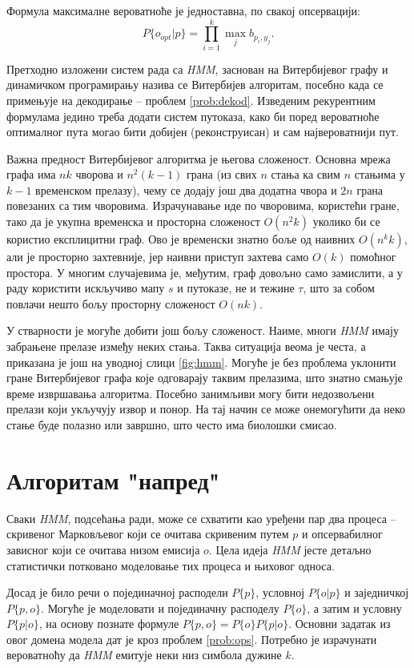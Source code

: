 \documentclass[12pt,oneside]{memoir}
\begin{document}
\begin{CJK}{UTF8}{ipxm}
Формула максималне вероватноће је једноставна, по свакој опсервацији: $$P\{o_{opt} | p\} = \prod_{i=1}^k \max_j b_{p_i, y_j}.$$

Претходно изложени систем рада са \textit{HMM}, заснован на Витербијевог графу и динамичком програмирању назива се Витербијев алгоритам\cite{ba10c}, посебно када се примењује на декодирање -- проблем \ref{prob:dekod}. Изведеним рекурентним формулама једино треба додати систем путоказа, како би поред вероватноће оптималног пута могао бити добијен (реконструисан) и сам највероватнији пут.

Важна предност Витербијевог алгоритма је његова сложеност. Основна мрежа графа има $nk$ чворова и $n^2 (k-1)$ грана (из свих $n$ стања ка свим $n$ стањима у $k-1$ временском прелазу), чему се додају још два додатна чвора и $2n$ грана повезаних са тим чворовима. Израчунавање иде по чворовима, користећи гране, тако да је укупна временска и просторна сложеност $O(n^2 k)$ уколико би се користио експлицитни граф. Ово је временски знатно боље од наивних $O(n^k k)$, али је просторно захтевније, јер наивни приступ захтева само $O(k)$ помоћног простора. У многим случајевима је, међутим, граф довољно само замислити, а у раду користити искључиво мапу $s$ и путоказе, не и тежине $\tau$, што за собом повлачи нешто бољу просторну сложеност $O(nk)$.

У стварности је могуће добити још бољу сложеност. Наиме, многи \textit{HMM} имају забрањене прелазе између неких стања. Таква ситуација веома је честа, а приказана је још на уводној слици \ref{fig:hmm}. Могуће је без проблема уклонити гране Витербијевог графа које одговарају таквим прелазима, што знатно смањује време извршавања алгоритма. Посебно занимљиви могу бити недозвољени прелази који укључују извор и понор. На тај начин се може онемогућити да неко стање буде полазно или завршно, што често има биолошки смисао.

\section{Алгоритам "напред"}
Сваки \textit{HMM}, подсећања ради, може се схватити као уређени пар два процеса -- скривеног Марковљевог који се очитава скривеним путем $p$ и опсервабилног зависног који се очитава низом емисија $o$. Цела идеја \textit{HMM} јесте детаљно статистички потковано моделовање тих процеса и њиховог односа.

Досад је било речи о појединачној расподели $P\{p\}$, условној $P\{o | p\}$ и заједничкој $P\{p, o\}$. Могуће је моделовати и појединачну расподелу $P\{o\}$, а затим и условну $P\{p | o\}$, на основу познате формуле $P\{p, o\} = P\{o\} P\{p | o\}$. Основни задатак из овог домена модела дат је кроз проблем \ref{prob:ops}. Потребно је израчунати вероватноћу да \textit{HMM} емитује неки низ симбола дужине $k$.


\end{CJK}
\end{document}
